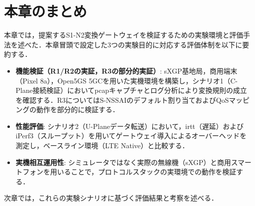 \section{本章のまとめ}

本章では，提案するS1-N2変換ゲートウェイを検証するための実験環境と評価手法を述べた．本章冒頭で設定した3つの実験目的に対応する評価体制を以下に要約する．

\begin{itemize}
    \item \textbf{機能検証（R1/R2の実証，R3の部分的実証）}: sXGP基地局，商用端末（Pixel 8a），Open5GS 5GCを用いた実機環境を構築し，シナリオ1（C-Plane接続検証）においてpcapキャプチャとログ分析により変換規則の成立を確認する．R3についてはS-NSSAIのデフォルト割り当ておよびQoSマッピングの動作を部分的に検証する．
    \item \textbf{性能評価}: シナリオ2（U-Planeデータ転送）において，irtt（遅延）およびiPerf3（スループット）を用いてゲートウェイ導入によるオーバーヘッドを測定し，ベースライン環境（LTE Native）と比較する．
    \item \textbf{実機相互運用性}: シミュレータではなく実際の無線機（sXGP）と商用スマートフォンを用いることで，プロトコルスタックの実環境での動作を検証する．
\end{itemize}

次章では，これらの実験シナリオに基づく評価結果と考察を述べる．
